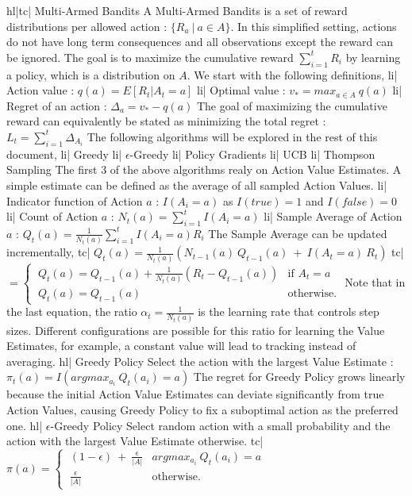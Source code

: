 hl|tc| Multi-Armed Bandits
A Multi-Armed Bandits is a set of reward distributions per allowed action : \( \{ R_a \ | \ a \in A \} \). In this simplified setting, actions do not have long term consequences and all observations except the reward can be ignored. The goal is to maximize the cumulative reward \( \sum_{i=1}^t R_i \) by learning a policy, which is a distribution on \( A \). We start with the following definitions,
li| Action value : \( q(a) = E[R_t | A_t = a] \)
li| Optimal value : \( v_* = max_{a \in A} \ q(a) \)
li| Regret of an action : \( \Delta_a = v_* - q(a) \)
The goal of maximizing the cumulative reward can equivalently be stated as minimizing the total regret : \( L_t = \sum_{i=1}^t \Delta_{A_i} \)
The following algorithms will be explored in the rest of this document,
li| Greedy
li| \(\epsilon\)-Greedy
li| Policy Gradients
li| UCB
li| Thompson Sampling
The first 3 of the above algorithms realy on Action Value Estimates. A simple estimate can be defined as the average of all sampled Action Values.
li| Indicator function of Action \(a\) : \( I(A_i = a) \) as \( I(true) = 1 \) and \( I(false) = 0 \)
li| Count of Action \(a\) : \( N_t(a) = \sum_{i=1}^t I(A_i = a) \)
li| Sample Average of Action \(a\) : \( Q_t(a) = \frac{1}{N_t(a)} \sum_{i=1}^t I(A_i = a) R_i \)
The Sample Average can be updated incrementally,
tc| \( Q_t(a) = \frac{1}{N_{t}(a)} (N_{t-1}(a) \ Q_{t-1}(a) \ + \ I(A_t = a) \ R_t ) \)
tc| \( = \begin{cases} \ Q_t(a) = Q_{t-1}(a) + \frac{1}{N_t(a)}(R_t - Q_{t-1}(a)) & \text{if } A_t=a \\ \ Q_t(a) = Q_{t-1}(a) & \text{otherwise.} \end{cases} \)
Note that in the last equation, the ratio \( \alpha_t = \frac{1}{N_t(a)} \) is the learning rate that controls step sizes. Different configurations are possible for this ratio for learning the Value Estimates, for example, a constant value will lead to tracking instead of averaging.
hl| Greedy Policy
Select the action with the largest Value Estimate : \( \pi_t(a) = I(argmax_{a_i} \ Q_t(a_i) = a) \)
The regret for Greedy Policy grows linearly because the initial Action Value Estimates can deviate significantly from true Action Values, causing Greedy Policy to fix a suboptimal action as the preferred one.
hl| \(\epsilon\)-Greedy Policy
Select random action with a small probability and the action with the largest Value Estimate otherwise.
tc| \( \pi(a) = \begin{cases} \ (1 - \epsilon) \ + \ \frac{\epsilon}{|A|} & argmax_{a_i} \ Q_t(a_i)=a \\ \ \frac{\epsilon}{|A|} & \text{otherwise.} \end{cases} \)
